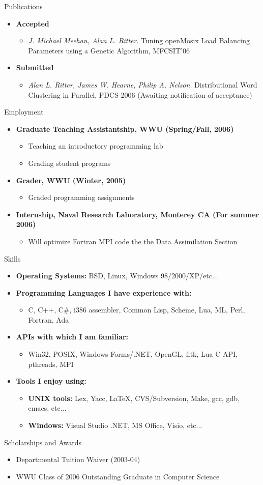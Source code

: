 \documentclass[11pt,oneside]{article}
\newenvironment{ressection}[1]{
	\vspace{4pt}
	{\fontfamily{phv}\selectfont\Large#1}
	\begin{itemize}
	\vspace{3pt}
}{
	\end{itemize}
}
\newcommand{\resitem}[1]{
	\vspace{-4pt}
	\item \begin{flushleft} #1 \end{flushleft}
}
\newcommand{\ressubitem}[1]{
	\vspace{-1pt}
	\item \begin{flushleft} #1 \end{flushleft}
}
\newenvironment{reslist}[1]{
	\resitem{\textbf{#1}}
	\begin{itemize}
}{
	\end{itemize}
}
\begin{document}
\begin{ressection}{Publications}
  \begin{reslist}{Accepted}
    \ressubitem{\emph{J. Michael Meehan, Alan L. Ritter}. Tuning openMosix Load Balancing Parameters using a Genetic Algorithm, MFCSIT'06}
  \end{reslist}
  \begin{reslist}{Submitted}
    \ressubitem{\emph{Alan L. Ritter, James W. Hearne, Philip A. Nelson}. Distributional Word Clustering in Parallel, PDCS-2006 (Awaiting notification of acceptance)}
  \end{reslist}
\end{ressection}

\begin{ressection}{Employment}
  \begin{reslist}{Graduate Teaching Assistantship, WWU (Spring/Fall, 2006)}
    \ressubitem{Teaching an introductory programming lab}
    \ressubitem{Grading student programs}
  \end{reslist}

  \begin{reslist}{Grader, WWU (Winter, 2005)}
    \ressubitem{Graded programming assignments}
  \end{reslist}
  
  \begin{reslist}{Internship, Naval Research Laboratory, Monterey CA (For summer 2006)}
    \ressubitem{Will optimize Fortran MPI code the the Data Assimilation
      Section}
  \end{reslist}
  
\end{ressection}
\begin{ressection}{Skills}

	\resitem{\textbf{Operating Systems:} BSD, Linux, Windows 98/2000/XP/etc...}
 
	\begin{reslist}{Programming Languages I have experience with:}
		\ressubitem{C, C++, C\#, i386 assembler, Common Lisp, Scheme, Lua, ML, Perl, Fortran, Ada}
	\end{reslist}

	\begin{reslist}{APIs with which I am familiar:}
	  \ressubitem{Win32, POSIX, Windows Forms/.NET, OpenGL, fltk, Lua C API, pthreads, MPI}
	\end{reslist}

	\begin{reslist}{Tools I enjoy using:}
	  \ressubitem{\textbf{UNIX tools:} Lex, Yacc, \LaTeX, CVS/Subversion, Make, gcc, gdb, emacs, etc...}
	  \ressubitem{\textbf{Windows:} Visual Studio .NET, MS Office, Visio, etc...}
	\end{reslist}

\end{ressection}

\begin{ressection}{Scholarships and Awards}
  \resitem{Departmental Tuition Waiver (2003-04)}
  \resitem{WWU Class of 2006 Outstanding Graduate in Computer Science}
\end{ressection}
\end{document}
